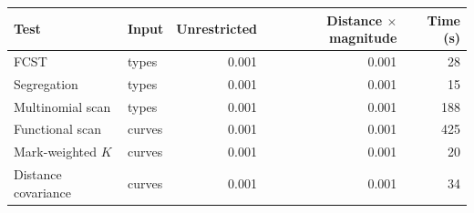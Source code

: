 \begin{tabular}{@{}llrrr@{}}
\toprule
Test & Input & Unrestricted & Distance $\times$ magnitude & Time (s) \\
\midrule
FCST & types & 0.001 & 0.001 & 28 \\
Segregation & types & 0.001 & 0.001 & 15 \\
Multinomial scan & types & 0.001 & 0.001 & 188 \\
Functional scan & curves & 0.001 & 0.001 & 425 \\
Mark-weighted $K$ & curves & 0.001 & 0.001 & 20 \\
Distance covariance & curves & 0.001 & 0.001 & 34 \\
\bottomrule
\end{tabular}
